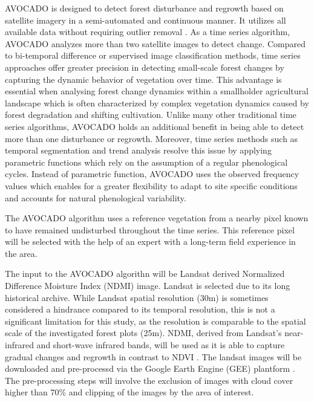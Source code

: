 AVOCADO is designed to detect forest disturbance and regrowth based on satellite imagery in a semi-automated and continuous manner. It utilizes all available data without requiring outlier removal \citep{decuyperContinuousMonitoringForest2022}. As a time series algorithm, AVOCADO analyzes more than two satellite images to detect change. Compared to bi-temporal difference or supervised image classification methods, time series approaches offer greater precision in detecting small-scale forest changes by capturing the dynamic behavior of vegetation over time. This advantage is essential when analysing forest change dynamics within a smallholder agricultural landscape which is often characterized by complex vegetation dynamics caused by forest degradation and shifting cultivation. Unlike many other traditional time series algorithms, AVOCADO holds an additional benefit in being able to detect more than one disturbance or regrowth. Moreover, time series methods such as temporal segmentation and trend analysis resolve this issue by applying parametric functions which rely on the assumption of a regular phenological cycles. Instead of parametric function, AVOCADO uses the observed frequency values which enables for a greater flexibility to adapt to site specific conditions and accounts for natural phenological variability. 


The AVOCADO algorithm uses a reference vegetation from a nearby pixel known to have remained undisturbed throughout the time series. This reference pixel will be selected with the help of an expert with a long-term field experience in the area. 

The input to the AVOCADO algorithn will be Landsat derived Normalized Difference Moisture Index (NDMI) image. Landsat is selected due to its long historical archive. While Landsat spatial resolution (30m) is sometimes considered a hindrance compared to its temporal resolution, this is not a significant limitation for this study, as the resolution is comparable to the spatial scale of the investigated forest plots (25m). NDMI, derived from Landsat's near-infrared and short-wave infrared bands, will be used as it is able to capture gradual changes and regrowth in contrast to NDVI . The landsat images will be downloaded and pre-processd via the Google Earth Engine (GEE) plantform \citep{gorelickGoogleEarthEngine2017}. The pre-processing steps will involve the exclusion of images with cloud cover higher than 70\% and clipping of the images by the area of interest. 

